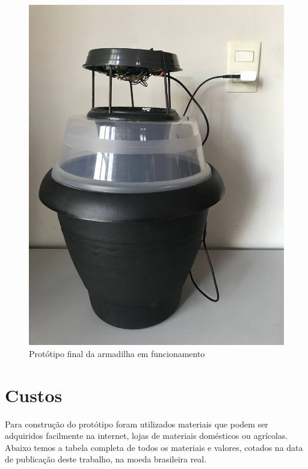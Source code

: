 \documentclass[
	12pt,				%
	openright,			%
	oneside,			%
	a4paper,			%
	chapter=TITLE,		%
	english,			%
	brazil				%
	]{abntex2}
\begin{document}
\begin{figure}[H]
    \centering
    \includegraphics[scale=0.09, angle=-90]{imagens/IMG_0609.jpg}
    \caption{Protótipo final da armadilha em funcionamento}
        \label{fig:protótipofinal}
    \end{figure}

\section{Custos}

Para construção do protótipo foram utilizados materiais que podem ser adquiridos facilmente na internet, lojas de materiais domésticos ou agrícolas.
Abaixo temos a tabela completa de todos os materiais e valores, cotados na data de publicação deste trabalho, na moeda brasileira real.
\end{document}
